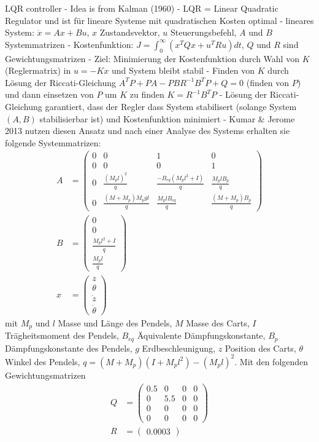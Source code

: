 LQR controller
- Idea is from Kalman (1960)
- LQR = Linear Quadratic Regulator und ist für lineare Systeme mit quadratischen Kosten optimal
- lineares System: $\dot{x} = Ax + Bu$, $x$ Zustandsvektor, $u$ Steuerungsbefehl, $A$ und $B$ Systemmatrizen
- Kostenfunktion: $J = \int_0^\infty (x^T Q x + u^T R u) dt$, $Q$ und $R$ sind Gewichtungsmatrizen
- Ziel: Minimierung der Kostenfunktion durch Wahl von $K$ (Reglermatrix) in $u = -Kx$ und System bleibt stabil
- Finden von $K$ durch Lösung der Riccati-Gleichung $A^T P + PA - PBR^{-1}B^T P + Q = 0$ (finden von $P$) und dann einsetzen von $P$ um $K$ zu finden $K = R^{-1}B^T P$
- Lösung der Riccati-Gleichung garantiert, dass der Regler dass System stabilisert (solange System $(A,B)$ stabilisierbar ist) und Kostenfunktion minimiert
- Kumar & Jerome 2013 nutzen diesen Ansatz und nach einer Analyse des Systems erhalten sie folgende Systemmatrizen:
\begin{align}
    A &= \begin{pmatrix}
        0 & 0 & 1 & 0 \\
        0 & 0 & 0 & 1 \\
        0 & \frac{(M_pl)^2}{q} & \frac{-B_{eq}(M_pl^2 + I)}{q} & \frac{M_plB_p}{q} \\
        0 & \frac{(M+M_p)M_pgl}{q} & \frac{M_plB_{eq}}{q} & \frac{(M+M_p)B_p}{q}
    \end{pmatrix} \\
    B &= \begin{pmatrix}
        0 \\
        0 \\
        \frac{M_pl^2+I}{q} \\
        \frac{M_pl}{q}
    \end{pmatrix} \\
    x &= \begin{pmatrix}
        z \\
        \theta \\
        \dot{z} \\
        \dot{\theta}
    \end{pmatrix}
\end{align}
mit $M_p$ und $l$ Masse und Länge des Pendels, $M$ Masse des Carts, $I$ Trägheitsmoment des Pendels, $B_{eq}$ Äquivalente Dämpfungskonstante, $B_p$ Dämpfungskonstante des Pendels, $g$ Erdbeschleunigung, $z$ Position des Carts, $\theta$ Winkel des Pendels, $q = (M+M_p)(I+M_pl^2) - (M_pl)^2$. Mit den folgenden Gewichtungsmatrizen
\begin{align}
    Q &= \begin{pmatrix}
        0.5 & 0 & 0 & 0 \\
        0 & 5.5 & 0 & 0 \\
        0 & 0 & 0 & 0 \\
        0 & 0 & 0 & 0
    \end{pmatrix} \\
    R &= \begin{pmatrix}
        0.0003
    \end{pmatrix}
\end{align}
